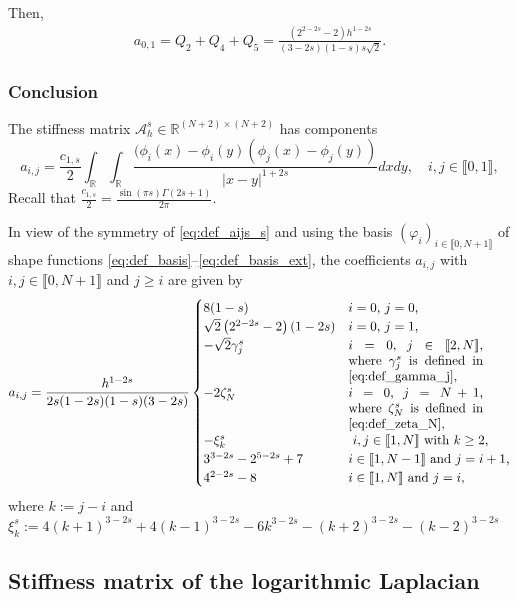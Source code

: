 \documentclass[10 pt]{article}
\newcommand\inter[1]{\llbracket #1\rrbracket}
\numberwithin{equation}{section}
\def\R{\mathbb{R}}
\begin{document}
Then,
\begin{align*}
a_{0,1}=Q_2+Q_4+Q_5=\frac{\left(2^{2-2 s}-2\right) h^{1-2 s}}{(3-2 s) (1-s) s\sqrt{2}}.
\end{align*}

\subsubsection{Conclusion}

The stiffness matrix $\mathcal A_h^s\in\mathbb R^{(N+2)\times (N+2)}$ has components
%
\begin{equation}\label{eq:def_aijs_s}
a_{i,j}=\frac{c_{1,s}}{2}\int_{\R}\int_{\R}\frac{(\phi_i(x)-\phi_i(y)(\phi_j(x)-\phi_j(y))}{|x-y|^{1+2s}}dx dy, \quad i,j\in\inter{0,1}, 
\end{equation}
Recall that $\frac{c_{1,s}}{2}=\frac{\sin (\pi  s) \Gamma (2 s+1)}{2\pi}$.


%
In view of the symmetry of \eqref{eq:def_aijs_s} and using the basis $(\varphi_i)_{i\in\inter{0,N+1}}$ of shape functions \eqref{eq:def_basis}--\eqref{eq:def_basis_ext}, the coefficients $a_{i,j}$ with $i,j\in\inter{0,N+1}$ and $j\geq i$ are given by
%
%
\begin{equation}\label{stiff:frac}
a_{i,j}= \frac{h^{1 - 2 s}}{2s(1-2s)(1-s)(3-2s)}
\begin{cases}
8(1-s) & \textnormal{$i=0$, $j=0$,} \\
\sqrt{2}\left(2^{2-2 s}-2\right)(1-2s) & \textnormal{$i=0$, $j=1$,} \\
-\sqrt{2}\gamma_j^s  & \parbox[t]{.3\columnwidth}{$i=0$, $j\in\inter{2,N}$, where $\gamma_j^s$ is defined in \eqref{eq:def_gamma_j},}\\
-2\zeta^s_{N}  & \parbox[t]{.3\columnwidth}{$i=0$, $j=N+1$, where $\zeta_N^s$ is defined in \eqref{eq:def_zeta_N},}\\
-\xi_k^s & \textnormal{ $i,j\in\inter{1,N}$ with $k\geq 2$,} \\
3^{3-2s}-2^{5-2s}+7 & \textnormal{$i\in\inter{1,N-1}$ and $j=i+1$,} \\
4^{2-2s}-8 & \textnormal{$i\in\inter{1,N}$ and $j=i$,}
\end{cases}
\end{equation}
where $k:=j-i$ and $\xi^s_k:=4(k+1)^{3-2s} + 4(k-1)^{3-2s}-6k^{3-2s}-(k+2)^{3-2s}-(k-2)^{3-2s}$


\subsection{Stiffness matrix of the logarithmic Laplacian}\label{sec:s:m:log}
\end{document}
